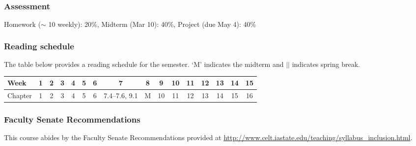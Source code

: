 \documentclass[12pt]{article}
\begin{document}
\subsubsection*{Assessment}

Homework ($\sim$ 10 weekly): 20\%, Midterm (Mar 10): 40\%, Project (due May 4): 40\%

\subsubsection*{Reading schedule}

The table below provides a reading schedule for the semester. `M' indicates the midterm and $\vert\vert$ indicates spring break. 

\vspace{0.2in} 

\begin{tabular}{|l|cccccccc||ccccccc|}
\hline
Week & 1 & 2 & 3 & 4 & 5 & 6 & 7 & 8 & 9 & 10 & 11 & 12 & 13 & 14 & 15 \\
\hline
Chapter & 1 & 2  & 3 & 4 & 5 & 6 & 7.4--7.6, 9.1 & M & 10 & 11 & 12 & 13 & 14 & 15 & 16\\
\hline
\end{tabular}

\subsubsection*{Faculty Senate Recommendations}

This course abides by the Faculty Senate Recommendations provided at \url{http://www.celt.iastate.edu/teaching/syllabus_inclusion.html}.
\end{document}
